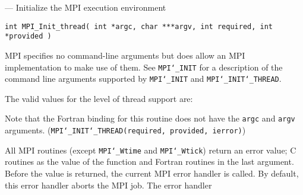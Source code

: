 \startmanpage
{}
--- Initialize the MPI execution environment 
\startvb\begin{verbatim}
int MPI_Init_thread( int *argc, char ***argv, int required, int *provided )

\end{verbatim}
\endvb

\par
{}
\par
{}
MPI specifies no command-line arguments but does allow an MPI
implementation to make use of them.  See {\tt MPI{\tt \char`\_}INIT} for a description of
the command line arguments supported by {\tt MPI{\tt \char`\_}INIT} and {\tt MPI{\tt \char`\_}INIT{\tt \char`\_}THREAD}.
\par
{}
The valid values for the level of thread support are:
\par
{}
Note that the Fortran binding for this routine does not have the {\tt argc} and
{\tt argv} arguments. ({\tt MPI{\tt \char`\_}INIT{\tt \char`\_}THREAD(required, provided, ierror)})
\par
\par
{}
\par
All MPI routines (except {\tt MPI{\tt \char`\_}Wtime} and {\tt MPI{\tt \char`\_}Wtick}) return an error value;
C routines as the value of the function and Fortran routines in the last
argument.  Before the value is returned, the current MPI error handler is
called.  By default, this error handler aborts the MPI job.  The error handler
